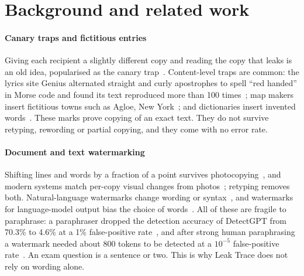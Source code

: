 \documentclass[10pt,a4paper]{article}
\theoremstyle{remark}
\begin{document}
\section{Background and related work}
\label{sec:related}

\paragraph{Canary traps and fictitious entries} Giving each recipient a slightly different copy and reading the copy that leaks is an old idea, popularised as the canary trap~\citep{wiki_canary}. Content-level traps are common: the lyrics site Genius alternated straight and curly apostrophes to spell \enquote{red handed} in Morse code and found its text reproduced more than 100 times~\citep{engadget2019genius}; map makers insert fictitious towns such as Agloe, New York~\citep{npr2014agloe}; and dictionaries insert invented words~\citep{oup2005}. These marks prove copying of an exact text. They do not survive retyping, rewording or partial copying, and they come with no error rate.

\paragraph{Document and text watermarking} Shifting lines and words by a fraction of a point survives photocopying~\citep{brassil1995}, and modern systems match per-copy visual changes from photos~\citep{echomark2026}; retyping removes both. Natural-language watermarks change wording or syntax~\citep{atallah2001,topkara2006,yang2022}, and watermarks for language-model output bias the choice of words~\citep{kirchenbauer2023,dathathri2024}. All of these are fragile to paraphrase: a paraphraser dropped the detection accuracy of DetectGPT from 70.3\% to 4.6\% at a 1\% false-positive rate~\citep{krishna2023}, and after strong human paraphrasing a watermark needed about 800 tokens to be detected at a $10^{-5}$ false-positive rate~\citep{kirchenbauer2024}. An exam question is a sentence or two. This is why Leak Trace does not rely on wording alone.
\end{document}

